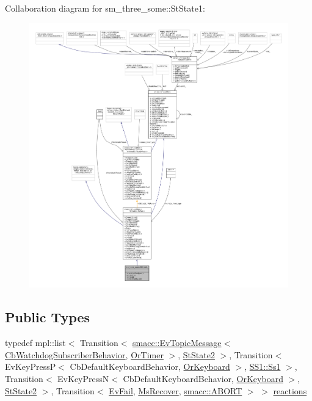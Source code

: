 Collaboration diagram for sm\+\_\+three\+\_\+some\+:\+:St\+State1\+:
\nopagebreak
\begin{figure}[H]
\begin{center}
\leavevmode
\includegraphics[width=350pt]{structsm__three__some_1_1StState1__coll__graph}
\end{center}
\end{figure}
\subsection*{Public Types}
\begin{DoxyCompactItemize}
\item 
typedef mpl\+::list$<$ Transition$<$ \hyperlink{structsmacc_1_1default__events_1_1EvTopicMessage}{smacc\+::\+Ev\+Topic\+Message}$<$ \hyperlink{classsm__three__some_1_1cl__subscriber_1_1CbWatchdogSubscriberBehavior}{Cb\+Watchdog\+Subscriber\+Behavior}, \hyperlink{classsm__three__some_1_1OrTimer}{Or\+Timer} $>$, \hyperlink{structsm__three__some_1_1StState2}{St\+State2} $>$, Transition$<$ Ev\+Key\+PressP$<$ Cb\+Default\+Keyboard\+Behavior, \hyperlink{classsm__three__some_1_1OrKeyboard}{Or\+Keyboard} $>$, \hyperlink{structsm__three__some_1_1SS1_1_1Ss1}{S\+S1\+::\+Ss1} $>$, Transition$<$ Ev\+Key\+PressN$<$ Cb\+Default\+Keyboard\+Behavior, \hyperlink{classsm__three__some_1_1OrKeyboard}{Or\+Keyboard} $>$, \hyperlink{structsm__three__some_1_1StState2}{St\+State2} $>$, Transition$<$ \hyperlink{structsm__three__some_1_1EvFail}{Ev\+Fail}, \hyperlink{classsm__three__some_1_1MsRecover}{Ms\+Recover}, \hyperlink{structsmacc_1_1default__transition__tags_1_1ABORT}{smacc\+::\+A\+B\+O\+RT} $>$ $>$ \hyperlink{structsm__three__some_1_1StState1_a8982c63408fe696dc24de5f8679decd6}{reactions}
\end{DoxyCompactItemize}
